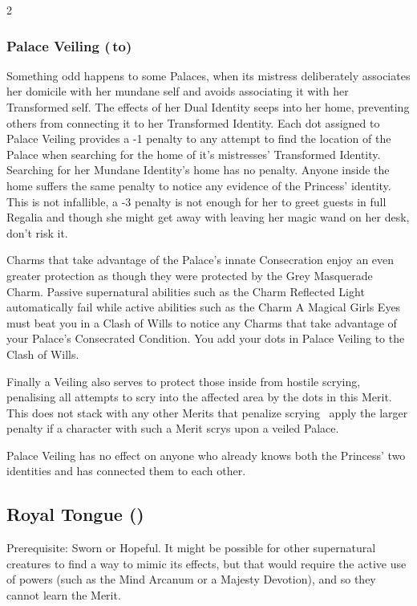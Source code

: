 \begin{multicols}{2}
\subsubsection*{Palace Veiling (\textbullet\,\nobreak\hspace{.16667em}to\nobreak\hspace{.16667em}\textbullet\textbullet\textbullet)}

Something odd happens to some Palaces, when its mistress deliberately associates her domicile with her mundane self and avoids associating it with her Transformed self. The effects of her Dual Identity seeps into her home, preventing others from connecting it to her Transformed Identity. Each dot assigned to Palace Veiling provides a -1 penalty to any attempt to find the location of the Palace when searching for the home of it's mistresses' Transformed Identity. Searching for her Mundane Identity's home has no penalty. Anyone inside the home suffers the same penalty to notice any evidence of the Princess' identity. This is not infallible, a -3 penalty is not enough for her to greet guests in full Regalia and though she might get away with leaving her magic wand on her desk, don't risk it. 

Charms that take advantage of the Palace's innate Consecration enjoy an even greater protection as though they were protected by the Grey Masquerade Charm. Passive supernatural abilities such as the Charm Reflected Light automatically fail while active abilities such as the Charm A Magical Girls Eyes must beat you in a Clash of Wills to notice any Charms that take advantage of your Palace's Consecrated Condition. You add your dots in Palace Veiling to the Clash of Wills. 

Finally a Veiling also serves to protect those inside from hostile scrying, penalising all attempts to scry into the affected area by the dots in this Merit. This does not stack with any other Merits that penalize scrying \textendash\, apply the larger penalty if a character with such a Merit scrys upon a veiled Palace.

Palace Veiling has no effect on anyone who already knows both the Princess' two identities and has connected them to each other.

\subsection*{Royal Tongue (\textbullet)}

Prerequisite: Sworn or Hopeful. It might be possible for other supernatural creatures to find a way to mimic its effects, but that would require the active use of powers (such as the Mind Arcanum or a Majesty Devotion), and so they cannot learn the Merit.\\


\end{multicols}
